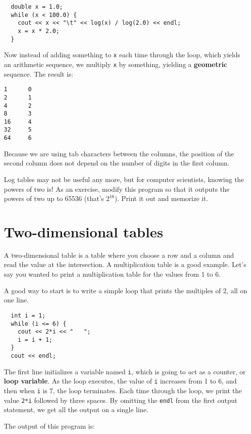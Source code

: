 \begin{lstlisting}
  double x = 1.0;
  while (x < 100.0) {
    cout << x << "\t" << log(x) / log(2.0) << endl;
    x = x * 2.0;
  }
\end{lstlisting}
%
Now instead of adding something to {\tt x} each time through
the loop, which yields an arithmetic sequence, we multiply
{\tt x} by something, yielding a {\bf geometric} sequence.
The result is:

\begin{lstlisting}
1      0
2      1
4      2
8      3
16     4
32     5
64     6
\end{lstlisting}
%
Because we are using tab characters between the columns, the
position of the second column does not depend on the number
of digits in the first column.

Log tables may not be useful any more, but for computer scientists,
knowing the powers of two is!  As an exercise, modify this program
so that it outputs the powers of two up to 65536
(that's $2^{16}$).  Print it out and memorize it.

\section{Two-dimensional tables}

A two-dimensional table is a table where you choose a row and
a column and read the value at the intersection.  A multiplication
table is a good example.  Let's say you wanted to print a
multiplication table for the values from 1 to 6.

A good way to start is to write a simple loop that prints
the multiples of 2, all on one line.

\begin{lstlisting}
  int i = 1;
  while (i <= 6) {
    cout << 2*i << "   ";
    i = i + 1;
  }
  cout << endl;
\end{lstlisting}
%
The first line initializes a variable named {\tt i}, which is
going to act as a counter, or {\bf loop variable}.  As the
loop executes, the value of {\tt i} increases from 1 to 6,
and then when {\tt i} is 7, the loop terminates.  Each
time through the loop, we print the value {\tt 2*i} followed
by three spaces.  By omitting the {\tt endl} from the
first output statement, we get 
all the output on a single line.


The output of this program is:

